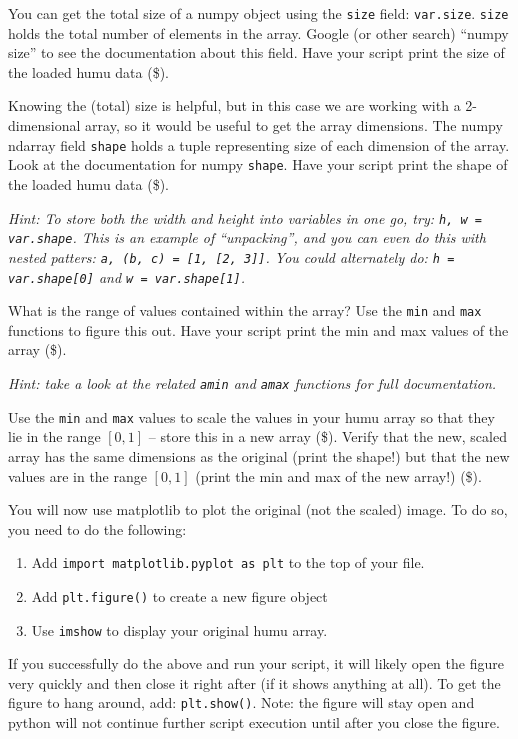 \documentclass[10pt]{article}
\begin{document}
\begin{enumerate}
You can get the total size of a numpy object using the {\tt size} field: {\tt var.size}.  {\tt size} holds the total number of elements in the array.  Google (or other search) ``numpy size'' to see the documentation about this field.  Have your script print the size of the loaded humu data (\$).

Knowing the (total) size is helpful, but in this case we are working with a 2-dimensional array, so it would be useful to get the array dimensions.  The numpy ndarray field {\tt shape} holds a tuple representing size of each dimension of the array.  Look at the documentation for numpy {\tt shape}.  Have your script print the shape of the loaded humu data (\$).

{\em Hint: To store both the width and height into variables in one go, try: {\tt h, w = var.shape}.  This is an example of ``unpacking'', and you can even do this with nested patters: {\tt a, (b, c) = [1, [2, 3]]}.  You could alternately do: {\tt h = var.shape[0]} and {\tt w = var.shape[1]}.}

What is the range of values contained within the array?  Use the {\tt min} and {\tt max} functions to figure this out.  Have your script print the min and max values of the array (\$).

{\em Hint: take a look at the related {\tt amin} and {\tt amax} functions for full documentation.}

Use the {\tt min} and {\tt max} values to scale the values in your humu array so that they lie in the range $[0, 1]$ -- store this in a new array (\$).  Verify that the new, scaled array has the same dimensions as the original (print the shape!) but that the new values are in the range $[0, 1]$ (print the min and max of the new array!) (\$).

You will now use matplotlib to plot the original (not the scaled) image.  To do so, you need to do the following:
\begin{enumerate}
\item Add {\tt import matplotlib.pyplot as plt} to the top of your file.
\item Add {\tt plt.figure()} to create a new figure object
\item Use {\tt imshow} to display your original humu array.
\end{enumerate}
If you successfully do the above and run your script, it will likely open the figure very quickly and then close it right after (if it shows anything at all).  To get the figure to hang around, add: {\tt plt.show()}.  Note: the figure will stay open and python will not continue further script execution until after you close the figure.


\end{enumerate}
\end{document}
